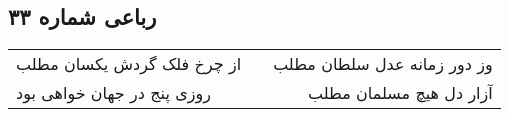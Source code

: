\begin{center}
\section*{رباعی شماره ۳۳}
\label{sec:sh033}
\begin{longtable}{l p{0.5cm} r}
از چرخ فلک گردش یکسان مطلب
&&
وز دور زمانه عدل سلطان مطلب
\\
روزی پنج در جهان خواهی بود
&&
آزار دل هیچ مسلمان مطلب
\\
\end{longtable}
\end{center}
